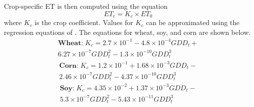 Crop-specific ET is then computed using the equation
\begin{equation}
    ET_c = K_c \times ET_0
\end{equation}
where $K_c$ is the crop coefficient. Values for $K_c$ can be approximated using the regression equations of \cite{nmsu}. The equations for wheat, soy, and corn are shown below.
\begin{multline}
    \textbf{Wheat:} \; K_c = 2.7\times 10^{-1} - 4.8\times 10^{-4}GDD_t + \\ 6.27 \times 10^{-7}GDD_t^2 - 1.3 \times 10^{-10} GDD_t^3
\end{multline}
\begin{multline}
    \textbf{Corn:} \; K_c = 1.2\times 10^{-1} + 1.68\times 10^{-3}GDD_t - \\ 2.46 \times 10^{-7}GDD_t^2 - 4.37 \times 10^{-10} GDD_t^3
\end{multline}
\begin{multline}
    \textbf{Soy:} \; K_c = 4.35\times 10^{-2} + 1.37\times 10^{-3}GDD_t - \\ 5.3 \times 10^{-7}GDD_t^2 - 5.43 \times 10^{-11} GDD_t^3
\end{multline}

\newpage
